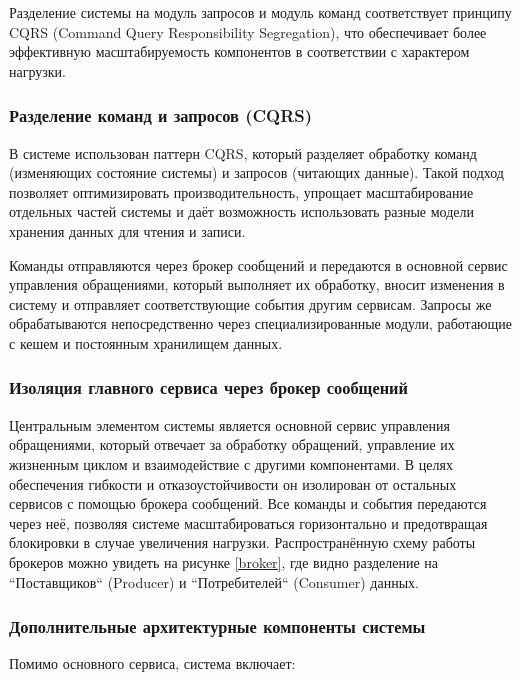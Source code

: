 Разделение системы на модуль запросов и модуль команд соответствует принципу CQRS (Command Query Responsibility Segregation\cite{CQRS}), что обеспечивает более эффективную масштабируемость компонентов в соответствии с характером нагрузки.

\subsubsection{Разделение команд и запросов (CQRS)}

В системе использован паттерн CQRS, который разделяет обработку команд (изменяющих состояние системы) и запросов (читающих данные). Такой подход позволяет оптимизировать производительность, упрощает масштабирование отдельных частей системы и даёт возможность использовать разные модели хранения данных для чтения и записи.

Команды отправляются через брокер сообщений и передаются в основной сервис управления обращениями, который выполняет их обработку, вносит изменения в систему и отправляет соответствующие события другим сервисам. Запросы же обрабатываются непосредственно через специализированные модули, работающие с кешем и постоянным хранилищем данных.

\subsubsection{Изоляция главного сервиса через брокер сообщений}

Центральным элементом системы является основной сервис управления обращениями, который отвечает за обработку обращений, управление их жизненным циклом и взаимодействие с другими компонентами. В целях обеспечения гибкости и отказоустойчивости он изолирован от остальных сервисов с помощью брокера сообщений. Все команды и события передаются через неё, позволяя системе масштабироваться горизонтально и предотвращая блокировки в случае увеличения нагрузки. Распространённую схему работы брокеров можно увидеть на рисунке \ref{broker}, где видно разделение на ``Поставщиков`` (Producer) и ``Потребителей`` (Consumer) данных.


\subsubsection{Дополнительные архитектурные компоненты системы}

Помимо основного сервиса, система включает:

